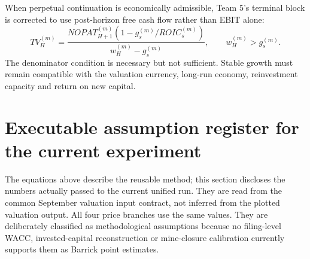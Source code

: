 When perpetual continuation is economically admissible, Team 5's terminal
block is corrected to use post-horizon free cash flow rather than EBIT alone:
\begin{equation}
TV_H^{(m)}=
\frac{NOPAT_{H+1}^{(m)}
\left(1-g_s^{(m)}/ROIC_s^{(m)}\right)}
{w_H^{(m)}-g_s^{(m)}},
\qquad w_H^{(m)}>g_s^{(m)}.
\end{equation}
The denominator condition is necessary but not sufficient. Stable growth must
remain compatible with the valuation currency, long-run economy, reinvestment
capacity and return on new capital.

\section{Executable assumption register for the current experiment}
\label{sec:executable-valuation-assumptions}

The equations above describe the reusable method; this section discloses the
numbers actually passed to the current unified run. They are read from
the common September valuation input contract, not inferred
from the plotted valuation output. All four price branches use the same values.
They are deliberately classified as methodological assumptions because no
filing-level WACC, invested-capital reconstruction or mine-closure calibration
currently supports them as Barrick point estimates.

